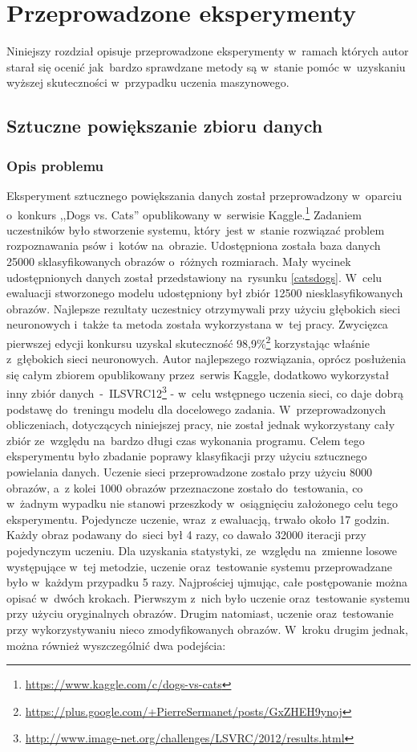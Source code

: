 \section{Przeprowadzone eksperymenty} \label{results}
Niniejszy rozdział opisuje przeprowadzone eksperymenty w~ramach których autor starał się ocenić jak~bardzo sprawdzane metody są w~stanie pomóc w~uzyskaniu wyższej skuteczności w~przypadku uczenia maszynowego. 

\subsection{Sztuczne powiększanie zbioru danych}
\subsubsection{Opis problemu}
Eksperyment sztucznego powiększania danych został przeprowadzony w~oparciu o~konkurs ,,Dogs vs. Cats'' opublikowany w~serwisie Kaggle.\footnote{\label{myfootnote1}\url{https://www.kaggle.com/c/dogs-vs-cats}} Zadaniem uczestników było stworzenie systemu, który~jest w~stanie rozwiązać problem rozpoznawania psów i~kotów na~obrazie. Udostępniona została baza danych 25000 sklasyfikowanych obrazów o~różnych rozmiarach. Mały wycinek udostępnionych danych został przedstawiony na~rysunku \ref{catsdogs}. W~celu ewaluacji stworzonego modelu udostępniony był zbiór 12500 niesklasyfikowanych obrazów. Najlepsze rezultaty uczestnicy otrzymywali przy użyciu głębokich sieci neuronowych i~także ta metoda została wykorzystana w~tej pracy. Zwycięzca pierwszej edycji konkursu uzyskal skuteczność 98,9\%\footnote{\label{myfootnote2}\url{https://plus.google.com/+PierreSermanet/posts/GxZHEH9ynoj}} korzystając właśnie z~głębokich sieci neuronowych. Autor najlepszego rozwiązania, oprócz posłużenia się całym zbiorem opublikowany przez~serwis Kaggle, dodatkowo wykorzystał inny zbiór danych~-~ILSVRC12\footnote{\url{http://www.image-net.org/challenges/LSVRC/2012/results.html}} - w~celu wstępnego uczenia sieci, co daje dobrą podstawę do~treningu modelu dla docelowego zadania. W~przeprowadzonych obliczeniach, dotyczących niniejszej pracy, nie został jednak wykorzystany cały zbiór ze~względu na~bardzo długi czas wykonania programu. Celem tego eksperymentu było zbadanie poprawy klasyfikacji przy użyciu sztucznego powielania danych. Uczenie sieci przeprowadzone zostało przy użyciu 8000 obrazów, a~z kolei 1000 obrazów przeznaczone zostało do~testowania, co w~żadnym wypadku nie stanowi przeszkody w~osiągnięciu założonego celu tego eksperymentu. Pojedyncze uczenie, wraz~z ewaluacją, trwało około 17 godzin. Każdy obraz podawany do~sieci był 4 razy, co dawało 32000 iteracji przy pojedynczym uczeniu. Dla uzyskania statystyki, ze~względu na~zmienne losowe występujące w~tej metodzie, uczenie oraz~testowanie systemu przeprowadzane było w~każdym przypadku 5 razy. Najprościej ujmując, całe postępowanie można opisać w~dwóch krokach. Pierwszym z~nich było uczenie oraz~testowanie systemu przy użyciu oryginalnych obrazów. Drugim natomiast, uczenie oraz~testowanie przy wykorzystywaniu nieco zmodyfikowanych obrazów. W~kroku drugim jednak, można również wyszczególnić dwa podejścia:
